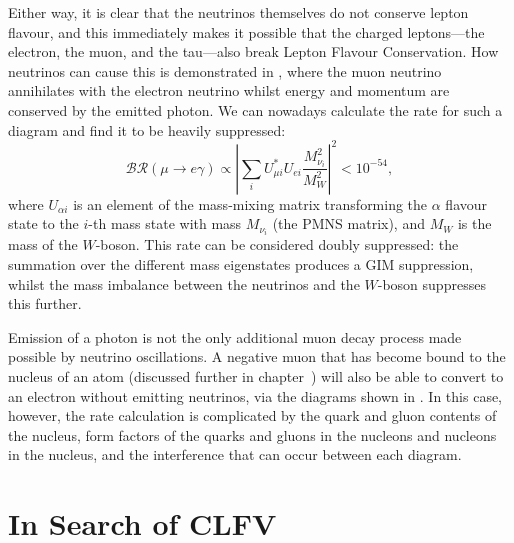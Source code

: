 Either way, it is clear that the neutrinos themselves do not conserve lepton flavour, and this immediately makes it possible that the charged leptons---the electron, the muon, and the tau---also break Lepton Flavour Conservation.
How neutrinos can cause this is demonstrated in , where the muon neutrino annihilates with the electron neutrino whilst energy and momentum are conserved by the emitted photon.
We can nowadays calculate the rate for such a diagram and find it to be heavily suppressed:
\begin{equation}
\mathcal{BR}(\mu\rightarrow{}e\gamma)\propto\left|\sum_iU^*_{\mu i}U_{ei} \frac{M^2_{\nu_i}}{M^2_W}\right|^2 < 10^{-54},
\end{equation}
where $U_{\alpha i}$ is an element of the mass-mixing matrix transforming the $\alpha$ flavour state to the $i$-th mass state with mass $M_{\nu_i}$ (the \ac{PMNS} matrix), and $M_W$ is the mass of the $W$-boson.
This rate can be considered doubly suppressed: the summation over the different mass eigenstates produces a GIM suppression, whilst the mass imbalance between the neutrinos and the $W$-boson suppresses this further.
\FigTheoryMuEGammViaNeutrino
\FigTheoryMuEConvViaNeutrino

Emission of a photon is not the only additional muon decay process made possible by neutrino oscillations.
A negative muon that has become bound to the nucleus of an atom (discussed further in chapter~) will also be able to convert to an electron without emitting neutrinos, via the diagrams
shown in .  
In this case, however, the rate calculation is complicated by the quark and gluon contents of the nucleus, form factors of the quarks and gluons in the nucleons and nucleons in the nucleus, and the interference that can occur between each diagram.

\section{In Search of \acf{CLFV}}
